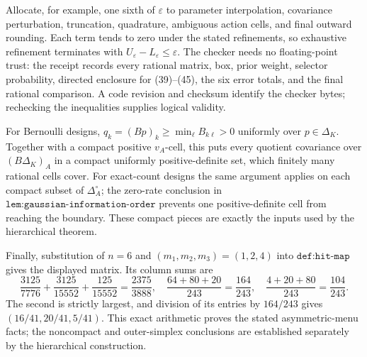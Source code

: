 Allocate, for example, one sixth of \(\varepsilon\) to parameter interpolation, covariance perturbation, truncation, quadrature, ambiguous action cells, and final outward rounding.  Each term tends to zero under the stated refinements, so exhaustive refinement terminates with \(U_\varepsilon-L_\varepsilon\leq\varepsilon\).  The checker needs no floating-point trust: the receipt records every rational matrix, box, prior weight, selector probability, directed enclosure for (39)--(45), the six error totals, and the final rational comparison.  A code revision and checksum identify the checker bytes; rechecking the inequalities supplies logical validity.

For Bernoulli designs, \(q_k=(Bp)_k\geq\min_\ell B_{k\ell}>0\) uniformly over \(p\in\Delta_K\).  Together with a compact positive \(v_A\)-cell, this puts every quotient covariance over \((B\Delta_K)_A\) in a compact uniformly positive-definite set, which finitely many rational cells cover.  For exact-count designs the same argument applies on each compact subset of \(\Delta_A^\circ\); the zero-rate conclusion in \(\texttt{lem:gaussian-information-order}\) prevents one positive-definite cell from reaching the boundary.  These compact pieces are exactly the inputs used by the hierarchical theorem.

Finally, substitution of \(n=6\) and \((m_1,m_2,m_3)=(1,2,4)\) into \(\texttt{def:hit-map}\) gives the displayed matrix.  Its column sums are
\[
\frac{3125}{7776}+\frac{3125}{15552}+\frac{125}{15552}=\frac{2375}{3888},
\quad \frac{64+80+20}{243}=\frac{164}{243},
\quad \frac{4+20+80}{243}=\frac{104}{243}. \tag{46}
\]
The second is strictly largest, and division of its entries by \(164/243\) gives \((16/41,20/41,5/41)\).  This exact arithmetic proves the stated asymmetric-menu facts; the noncompact and outer-simplex conclusions are established separately by the hierarchical construction.